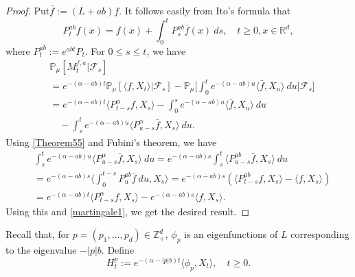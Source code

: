 \documentclass[12pt,a4paper]{amsart}
\theoremstyle{plain}
\theoremstyle{definition}
\numberwithin{equation}{section}
\begin{document}
\begin{proof}
    Put$\bar{f}:=(L+ab)f$.
    It follows easily from Ito's formula that
\begin{equation}\label{Theorem55}
    P_t^{ab}f(x)= f(x)+\int_0^t P_s^{ab}\bar{f}(x)~ds,\quad t\geq 0,x\in \mathbb R^d,
\end{equation}
    where $P_t^{ab} := e^{abt}P_t$.
    For $0\leq s\leq t$, we have
\begin{align}
\label{martingale1}
    &\mathbb{P}_{\mu}[M_t^{f,a}|\mathscr{F}_s]
    \\&=e^{-(\alpha-ab)t}\mathbb{P}_{\mu}\left[\langle f,X_t\rangle|\mathscr{F}_s\right]-\mathbb{P}_{\mu}\Big[\int_0^t e^{-(\alpha-ab)u}\langle \bar{f}, X_u\rangle~ du\Big|\mathscr{F}_s\big]
    \\&=e^{-(\alpha-ab)t}\langle P_{t-s}^{\alpha}f, X_s\rangle-\int_0^s e^{-(\alpha-ab)u}\langle \bar{f}, X_u\rangle~ du
    \\&\quad -\int_s^t e^{-(\alpha-ab)u}\langle P_{u-s}^{\alpha} \bar{f},X_s\rangle~ du.
\end{align}
    Using \eqref{Theorem55} and Fubini's theorem, we have
\begin{align}
    &\int_s^t e^{-(\alpha-ab)u}\langle P_{u-s}^{\alpha} \bar{f},X_s\rangle~ du=e^{-(\alpha-ab)s}\int_s^t\langle P_{u-s}^{ab}\bar{f},X_s\rangle~du\\
    &=e^{-(\alpha-ab)s}\Big\langle\int_0^{t-s}P_{u}^{ab}\bar{f}~du,X_s\Big\rangle=e^{-(\alpha-ab)s}\left(\langle P_{t-s}^{ab}f,X_s\rangle-\langle
    f,X_s\rangle\right)\\
    &=e^{-(\alpha-ab)t}\langle P_{t-s}^{\alpha}f, X_s\rangle-e^{-(\alpha-ab)s}\langle
    f,X_s\rangle.
\end{align}
    Using this and \eqref{martingale1}, we get the desired result.
\end{proof}

    Recall that, for $p=(p_1,...,p_d)\in \mathbb Z_+^d$,  $\phi_p$ is an eigenfunctions of $L$ corresponding to the eigenvalue $-|p|b$. Define
\[
    H_t^p
    :=e^{-(\alpha-|p|b)t}\langle\phi_p,X_t\rangle, \quad t\geq 0.
\]
\end{document}
